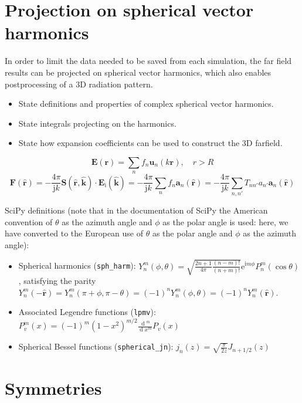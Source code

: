 \documentclass[a4paper,12pt]{article}
\renewcommand{\vec}[1]{\boldsymbol{#1}}
\newcommand{\unitvec}[1]{\hat{\vec{#1}}}
\newcommand{\mrm}[1]{\mathrm{#1}}
\newcommand{\diff}{\operatorname{d}\!}
\newcommand{\mat}[1]{\mathbf{#1}}
\newcommand{\iu}{\mrm{i}}
\newcommand{\ju}{\mrm{j}}
\newcommand{\eu}{\mrm{e}}
\newcommand{\Ev}{\vec{E}}
\newcommand{\Fv}{\vec{F}}
\newcommand{\rv}{\vec{r}}
\newcommand{\av}{\vec{a}}
\newcommand{\ruv}{\unitvec{r}}
\newcommand{\kuv}{\unitvec{k}}
\newcommand{\SM}{\mat{S}}
\newcommand{\uv}{\vec{u}}
\begin{document}
\section{Projection on spherical vector harmonics}
\label{sec:sphericalvectorharmonics}

In order to limit the data needed to be saved from each simulation,
the far field results can be projected on spherical vector harmonics,
which also enables postprocessing of a 3D radiation pattern.
\begin{itemize}
\item State definitions and properties of complex spherical vector harmonics.
\item State integrals projecting on the harmonics.
\item State how expansion coefficients can be used to construct the 3D farfield.
\end{itemize}
\begin{equation}
  \Ev(\rv) = \sum_{n}f_{n}\uv_{n}(k\rv), \quad r>R
\end{equation}
\begin{equation}
  \Fv(\ruv) = -\frac{4\pi}{\ju k}\SM(\ruv,\kuv)\cdot\Ev_{\mrm{i}}(\kuv) = -\frac{4\pi}{\ju k}\sum_{n}f_{n}\av_{n}(\ruv) = -\frac{4\pi}{\ju k}\sum_{n,n'}T_{nn'}a_{n'}\av_{n}(\ruv)
\end{equation}

SciPy definitions (note that in the documentation of SciPy the
American convention of $\theta$ as the azimuth angle and $\phi$ as the
polar angle is used: here, we have converted to the European use of
$\theta$ as the polar angle and $\phi$ as the azimuth angle):
\begin{itemize}
\item Spherical harmonics (\verb+sph_harm+): $Y^{m}_{n}(\phi,\theta) = \sqrt{\frac{2n+1}{4\pi}\frac{(n-m)!}{(n+m)!}} \eu^{\iu m\phi} P^{m}_{n}(\cos\theta)$, satisfying the parity $Y^{m}_{n}(-\ruv) = Y^{m}_{n}(\pi+\phi,\pi-\theta) = (-1)^{n}Y^{m}_{n}(\phi,\theta) = (-1)^{n}Y^{m}_{n}(\ruv)$.
\item Associated Legendre functions (\verb+lpmv+): $P_{v}^{m}(x) = (-1)^{m} (1 - x^{2})^{m/2} \frac{\diff^{m}}{\diff x^{m}} P_{v}(x)$
\item Spherical Bessel functions (\verb+spherical_jn+): $j_{n}(z) = \sqrt{\frac{\pi}{2z}} J_{n+1/2}(z)$
\end{itemize}

\section{Symmetries}
\label{sec:symmetries}
\end{document}
